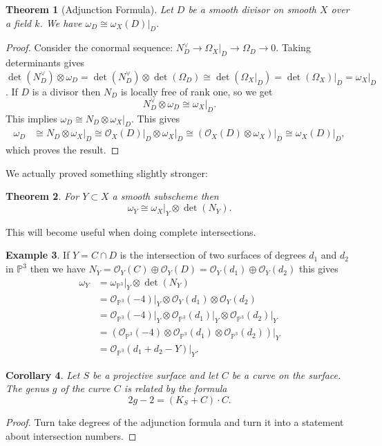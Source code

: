 \documentclass[12pt]{article}
\numberwithin{equation}{section}
\newtheorem{theorem}{Theorem}[subsection]
\newtheorem{corollary}[theorem]{Corollary}
\theoremstyle{definition}
\newtheorem{example}[theorem]{Example}
\theoremstyle{remark}
\newcommand{\Ocal}{\mathcal{O}}
\newcommand{\PP}{\mathbb{P}}
\begin{document}
\begin{theorem}[Adjunction Formula]
	Let $D$ be a smooth divisor on smooth $X$ over a field $k$. 
	We have $ \omega_D \cong \omega_X(D)\vert_D. $
\end{theorem}
\begin{proof}
	Consider the conormal sequence: $N_D^{\vee} \to \Omega_X\vert_D \to \Omega_D \to 0$. 
	Taking determinants gives $\det(N_D^{\vee}) \otimes\omega_D = \det(N_D^{\vee}) \otimes \det(\Omega_D) \cong \det(\Omega_X\vert_D) = \det(\Omega_X)\vert_D = \omega_X \vert_D$. 
	If $D$ is a divisor then $N_D$ is locally free of rank one, so we get 
	 $$ N_D^{\vee} \otimes \omega_D \cong \omega_X \vert_D.$$
	 This implies $\omega_D \cong N_D\otimes \omega_X\vert_D$.
	 This gives 
	  \begin{align*}
	  \omega_D &\cong N_D \otimes \omega_X\vert_D \cong \Ocal_X(D)\vert_D \otimes \omega_X \vert_D \cong (\Ocal_X(D)\otimes \omega_X)\vert_D\cong \omega_X(D)\vert_D,
	  \end{align*}
	  which proves the result.
\end{proof}

We actually proved something slightly stronger:
\begin{theorem}\label{thm:strong-adjunction}
	For $Y\subset X$ a smooth subscheme then 
	$$\omega_Y \cong \omega_X\vert_Y \otimes \det(N_Y).$$
\end{theorem}
This will become useful when doing complete intersections. 

\begin{example}
	If $Y=C\cap D$ is the intersection of two surfaces of degrees $d_1$ and $d_2$ in $\PP^3$ then we have $N_Y = \Ocal_Y(C)\oplus \Ocal_Y(D) = \Ocal_Y(d_1) \oplus \Ocal_Y(d_2)$ this gives
	\begin{align*} 
	 \omega_Y &= \omega_{\PP^3}\vert_Y \otimes \det(N_Y)\\
	 &= \Ocal_{\PP^3}(-4)\vert_Y \otimes \Ocal_Y(d_1) \otimes \Ocal_Y(d_2)\\
	 &=\Ocal_{\PP^3}(-4)\vert_Y \otimes \Ocal_{\PP^3}(d_1)\vert_Y \otimes \Ocal_{\PP^3}(d_2)\vert_Y\\
	 &=\left( \Ocal_{\PP^3}(-4)\otimes \Ocal_{\PP^3}(d_1)\otimes \Ocal_{\PP^3}(d_2)\right) \vert_Y \\
	 &= \Ocal_{\PP^3}(d_1+d_2-Y) \vert_Y.
	 \end{align*} 
\end{example}

\begin{corollary}
	Let $S$ be a projective surface and let $C$ be a curve on the surface. 
	The genus $g$ of the curve $C$ is related by the formula
	\begin{equation}
	2g-2 = (K_S+C)\cdot C.
	\end{equation}
\end{corollary}
\begin{proof}
	Turn take degrees of the adjunction formula and turn it into a statement about intersection numbers.
\end{proof}
\end{document}
